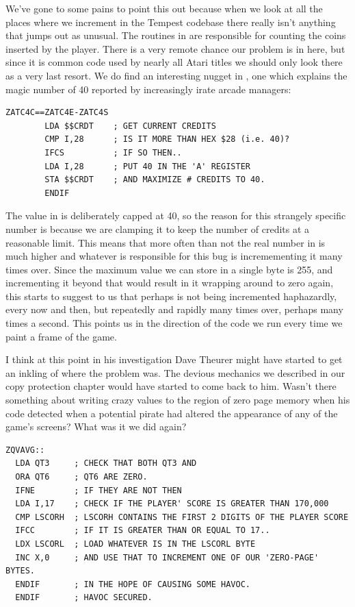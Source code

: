 We've gone to some pains to point this out because when we look at all the places where we increment  in the
Tempest codebase there really isn't anything that jumps out as unusual. The routines in  are responsible for
counting the coins inserted by the player. There is a very remote chance our problem is in here, but since it is common code used
by nearly all Atari titles we should only look there as a very last resort. We do find an interesting nugget in , one
which explains the magic number of 40 reported by increasingly irate arcade managers:

\begin{lstlisting}
ZATC4C==ZATC4E-ZATC4S
        LDA $$CRDT    ; GET CURRENT CREDITS
        CMP I,28      ; IS IT MORE THAN HEX $28 (i.e. 40)?
        IFCS          ; IF SO THEN.. 
        LDA I,28      ; PUT 40 IN THE 'A' REGISTER
        STA $$CRDT    ; AND MAXIMIZE # CREDITS TO 40.
        ENDIF
\end{lstlisting}

The value in  is deliberately capped at 40, so the reason for this strangely specific number is because we are
clamping it to keep the number of credits at a reasonable limit. This means that more often than not the real number in 
is much higher and whatever is responsible for this
bug is incremementing it many times over. Since the maximum value we can store in a single byte is 255, and incrementing it beyond
that would result in it wrapping around to zero again, this starts to suggest to us that perhaps  is not being incremented
haphazardly, every now and then, but repeatedly and rapidly many times over, perhaps many times a second. This points us in the direction
of the code we run every time we paint a frame of the game. 

I think at this point in his investigation Dave Theurer might have started to get an inkling of where the problem was. The devious
mechanics we described in our copy protection chapter would have started to come back to him. Wasn't there something about writing
crazy values to the region of zero page memory when his code detected when a potential pirate had altered the appearance of any of the
game's screens? What was it we did again?

\begin{lstlisting}
ZQVAVG::
  LDA QT3     ; CHECK THAT BOTH QT3 AND
  ORA QT6     ; QT6 ARE ZERO.
  IFNE        ; IF THEY ARE NOT THEN
  LDA I,17    ; CHECK IF THE PLAYER' SCORE IS GREATER THAN 170,000
  CMP LSCORH  ; LSCORH CONTAINS THE FIRST 2 DIGITS OF THE PLAYER SCORE
  IFCC        ; IF IT IS GREATER THAN OR EQUAL TO 17..
  LDX LSCORL  ; LOAD WHATEVER IS IN THE LSCORL BYTE
  INC X,0     ; AND USE THAT TO INCREMENT ONE OF OUR 'ZERO-PAGE' BYTES.
  ENDIF       ; IN THE HOPE OF CAUSING SOME HAVOC.
  ENDIF       ; HAVOC SECURED.
\end{lstlisting}

